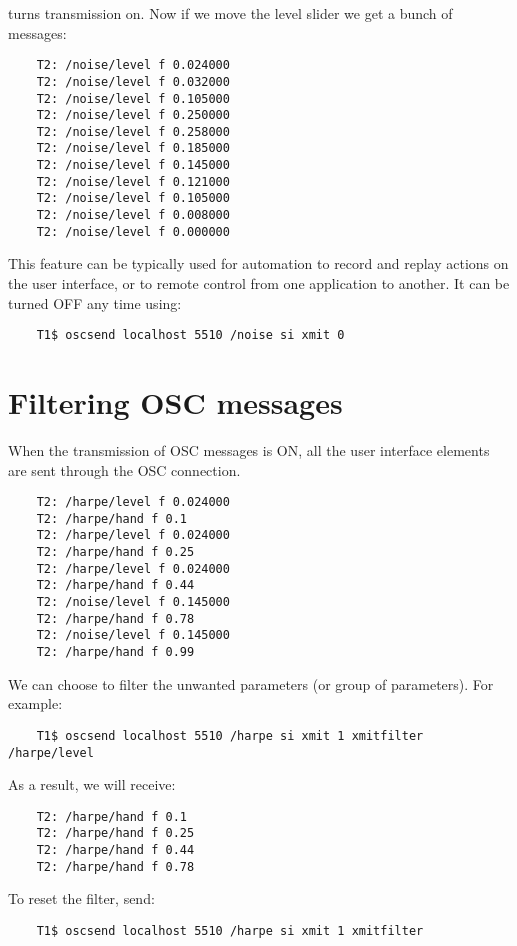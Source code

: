 turns transmission on. Now if we move the level slider we get a bunch of messages:

\begin{lstlisting}
	T2: /noise/level f 0.024000
	T2: /noise/level f 0.032000
	T2: /noise/level f 0.105000
	T2: /noise/level f 0.250000
	T2: /noise/level f 0.258000
	T2: /noise/level f 0.185000
	T2: /noise/level f 0.145000
	T2: /noise/level f 0.121000
	T2: /noise/level f 0.105000
	T2: /noise/level f 0.008000
	T2: /noise/level f 0.000000
\end{lstlisting}

This feature can be typically used for automation to record and replay actions on the user interface, or to remote control from one application to another. It can be turned OFF any time using:

\begin{lstlisting}
	T1$ oscsend localhost 5510 /noise si xmit 0
\end{lstlisting}

\section{Filtering OSC messages}

When the transmission of OSC messages is ON, all the user interface elements are sent through the OSC connection.  

\begin{lstlisting}
	T2: /harpe/level f 0.024000
	T2: /harpe/hand f 0.1
	T2: /harpe/level f 0.024000
	T2: /harpe/hand f 0.25
	T2: /harpe/level f 0.024000
	T2: /harpe/hand f 0.44
	T2: /noise/level f 0.145000
	T2: /harpe/hand f 0.78
	T2: /noise/level f 0.145000
	T2: /harpe/hand f 0.99
\end{lstlisting}

We can choose to filter the unwanted parameters (or group of parameters).  For example:
\begin{lstlisting}
	T1$ oscsend localhost 5510 /harpe si xmit 1 xmitfilter /harpe/level
\end{lstlisting}

As a result, we will receive:
\begin{lstlisting}
	T2: /harpe/hand f 0.1
	T2: /harpe/hand f 0.25
	T2: /harpe/hand f 0.44
	T2: /harpe/hand f 0.78
\end{lstlisting}

To reset the filter, send:
\begin{lstlisting}
	T1$ oscsend localhost 5510 /harpe si xmit 1 xmitfilter
\end{lstlisting}

